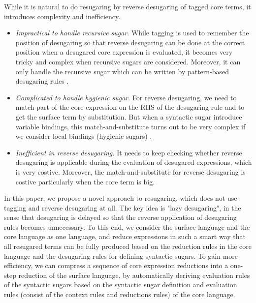 While it is natural to do resugaring by reverse desugaring of tagged core terms, it introduces complexity and inefficiency.
\begin{itemize}
\item {\em Impractical to handle recursive sugar}. While tagging is used to remember the position of desugaring so that reverse desugaring can be done at the correct position when a desugared core expression is evaluated, it  becomes very tricky and complex when recursive sugars are considered. Moreover, it can only handle the recursive sugar which can be written by pattern-based desugaring rules \cite{resugaring}.%

\item {\em Complicated to handle hygienic sugar}. For reverse desugaring, we need to match part of the core expression on the RHS of the desugaring rule and to get the surface term by substitution. But when a syntactic sugar introduce variable bindings, this match-and-substitute turns out to be very complex if we consider local bindings (hygienic sugars) \cite{hygienic}.

\item {\em Inefficient in reverse desugaring.} It needs to keep checking whether reverse desugaring is applicable during the evaluation of desugared expressions, which is very costive. Moreover, the match-and-substitute for reverse desugaring is costive particularly when the core term is big.

\end{itemize}

In this paper, we propose a novel approach to resugaring, which does not use tagging and reverse desugaring at all.
The key idea is "lazy desugaring", in the sense that desugaring is delayed so that the reverse application of desugaring rules becomes unnecessary.
To this end, we consider the surface language and the core language as one language, and reduce expressions in such a smart way that all resugared terms can be fully produced based on the reduction rules in the core language and  the desugaring rules for defining syntactic sugars. To gain more efficiency, we can compress a sequence of core expression reductions into a one-step reduction of the surface language, by automatically deriving evaluation rules of the syntactic sugars based on the syntactic sugar definition and evaluation rules (consist of the context rules and reductions rules) of the core language.



